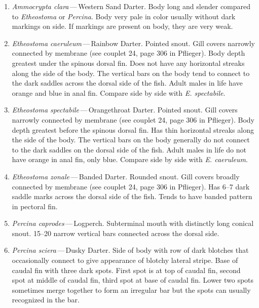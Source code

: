 \documentclass[11pt]{article}
\begin{document}
\begin{enumerate}
	\item\textit{Ammocrypta clara}\,—\,Western Sand Darter. Body long and slender compared to \textit{Etheostoma} or \textit{Percina}. Body very pale in color usually without dark markings on side. If markings are present on body, they are very weak.

	\item\textit{Etheostoma caeruleum}\,—\,Rainbow Darter. Pointed snout. Gill covers narrowly connected by membrane (see couplet 24, page 306 in Pflieger). Body depth greatest under the spinous dorsal fin. Does not have any horizontal streaks along the side of the body. The vertical bars on the body tend to connect to the dark saddles across the dorsal side of the fish. Adult males in life have orange and blue in anal fin. Compare side by side with \textit{E. spectabile}. 

	\item\textit{Etheostoma spectabile}\,—\,Orangethroat Darter. Pointed snout. Gill covers narrowly connected by membrane (see couplet 24, page 306 in Pflieger). Body depth greatest before the spinous dorsal fin. Has thin horizontal streaks along the side of the body. The vertical bars on the body generally do not connect to the dark saddles on the dorsal side of the fish. Adult males in life do not have orange in anal fin, only blue. Compare side by side with \textit{E. caeruleum}. 

	\item\textit{Etheostoma zonale}\,—\,Banded Darter. Rounded snout. Gill covers broadly connected by membrane (see couplet 24, page 306 in Pflieger). Has 6–7 dark saddle marks across the dorsal side of the fish. Tends to have banded pattern in pectoral fin.

	\item\textit{Percina caprodes}\,—\,Logperch. Subterminal mouth with distinctly long conical snout. 15–20 narrow vertical bars connected across the dorsal side.

	\item\textit{Percina sciera}\,—\,Dusky Darter. Side of body with row of dark blotches that occasionally connect to give appearance of blotchy lateral stripe. Base of caudal fin with three dark spots. First spot is at top of caudal fin, second spot at middle of caudal fin, third spot at base of caudal fin. Lower two spots sometimes merge together to form an irregular bar but the spots can usually recognized in the bar.
\end{enumerate}
\end{document}
